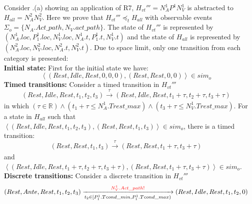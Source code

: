 Consider .(a) showing an application of R7, $H_{vt}'''=N^1_AP^1N^1_V$ is abstracted to $H_{all}=N^2_AN^2_V$. Here we prove that $H_{vt}'''\preceq_t H_{all}$ with observable events $\Sigma_o=\{N_A.Act\_path,N_V.act\_path\}$. The state of $H_{vt}'''$ is represented by $(N^1_A.loc,P^1_1.loc,N^1_V.loc,N^1_A.t,P^1_1.t,N^1_V.t)$ and the state of $H_{all}$ is represented by $(N^2_A.loc,N^2_V.loc,N^2_A.t,N^2_V.t)$. Due to space limit, only one transition from each category is presented:\\
\textbf{Initial state: }First for the initial state we have:
$$\left\langle (Rest,Idle,Rest,0,0,0),(Rest,Rest,0,0)\right\rangle\in sim_o$$ 
\textbf{Timed transitions: }Consider a timed transition in $H_{vt}'''$
$$(Rest,Idle,Rest,t_1,t_2,t_3)\xrightarrow[]{\tau}(Rest,Idle,Rest,t_1+\tau,t_2+\tau,t_3+\tau)$$
in which $(\tau\in\mathbb{R})\wedge (t_1+\tau\leq N^1_A.Trest\_max)\wedge( t_3+\tau\leq N^1_V.Trest\_max)$. For a state in $H_{all}$ such that $\left\langle (Rest,Idle,Rest,t_1,t_2,t_3),(Rest,Rest,t_1,t_3)\right\rangle\in sim_o$,  there is a timed transition:
$$(Rest,Rest,t_1,t_3)\xrightarrow[]{\tau}(Rest,Rest,t_1+\tau,t_3+\tau)$$
and $\left\langle (Rest,Idle,Rest,t_1+\tau,t_2+\tau,t_3+\tau),(Rest,Rest,t_1+\tau,t_3+\tau)\right\rangle\in sim_o$.\\
%
\textbf{Discrete transitions: }Consider a discrete transition in $H_{vt}'''$
$$(Rest,Ante,Rest,t_1,t_2,t_3)\xrightarrow[t_2\in [P^1_1.Tcond\_min, P^1_1.Tcond\_max) ]{\textcolor{red}{N^1_V.Act\_path!}}(Rest,Idle,Rest,t_1,t_2,0)$$
